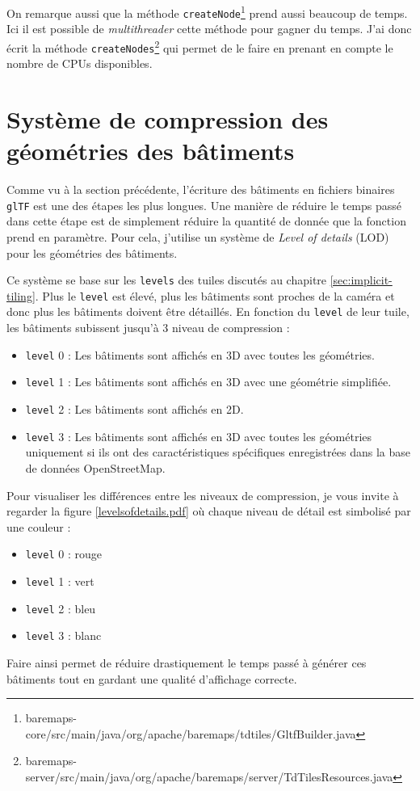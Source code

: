 On remarque aussi que la méthode \texttt{createNode}\footnote{baremaps-core/src/main/java/org/apache/baremaps/tdtiles/GltfBuilder.java} prend aussi beaucoup de temps. Ici il est possible de \textit{multithreader} cette méthode pour gagner du temps. J'ai donc écrit la méthode \texttt{createNodes}\footnote{baremaps-server/src/main/java/org/apache/baremaps/server/TdTilesResources.java} qui permet de le faire en prenant en compte le nombre de CPUs disponibles.

\newpage
\section{Système de compression des géométries des bâtiments}

Comme vu à la section précédente, l'écriture des bâtiments en fichiers binaires \texttt{glTF} est une des étapes les plus longues. Une manière de réduire le temps passé dans cette étape est de simplement réduire la quantité de donnée que la fonction prend en paramètre. Pour cela, j'utilise un système de \textit{Level of details} (LOD) pour les géométries des bâtiments.

Ce système se base sur les \texttt{levels} des tuiles discutés au chapitre \ref{sec:implicit-tiling}. Plus le \texttt{level} est élevé, plus les bâtiments sont proches de la caméra et donc plus les bâtiments doivent être détaillés. En fonction du \texttt{level} de leur tuile, les bâtiments subissent jusqu'à 3 niveau de compression :

\begin{itemize}
    \item \texttt{level} 0 : Les bâtiments sont affichés en 3D avec toutes les géométries.
    \item \texttt{level} 1 : Les bâtiments sont affichés en 3D avec une géométrie simplifiée.
    \item \texttt{level} 2 : Les bâtiments sont affichés en 2D.
    \item \texttt{level} 3 : Les bâtiments sont affichés en 3D avec toutes les géométries uniquement si ils ont des caractéristiques spécifiques enregistrées dans la base de données OpenStreetMap.
\end{itemize}

Pour visualiser les différences entre les niveaux de compression, je vous invite à regarder la figure \ref{levelsofdetails.pdf} où chaque niveau de détail est simbolisé par une couleur :

\begin{itemize}
    \item \texttt{level} 0 : rouge
    \item \texttt{level} 1 : vert
    \item \texttt{level} 2 : bleu
    \item \texttt{level} 3 : blanc
\end{itemize}


Faire ainsi permet de réduire drastiquement le temps passé à générer ces bâtiments tout en gardant une qualité d'affichage correcte.
